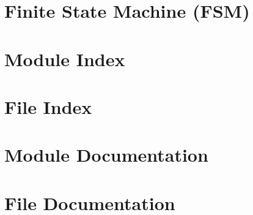 \documentclass[twoside]{book}
\newcommand{\+}{\discretionary{\mbox{\scriptsize$\hookleftarrow$}}{}{}}
\newcommand{\clearemptydoublepage}{%
  \newpage{\pagestyle{empty}\cleardoublepage}%
}
\begin{document}
\chapter{Finite State Machine (F\+SM)}
\label{_f_s_m_page}

\chapter{Module Index}

\chapter{File Index}

\chapter{Module Documentation}







\chapter{File Documentation}



















\backmatter
\newpage
{}
\clearemptydoublepage
{}
\printindex
\end{document}
